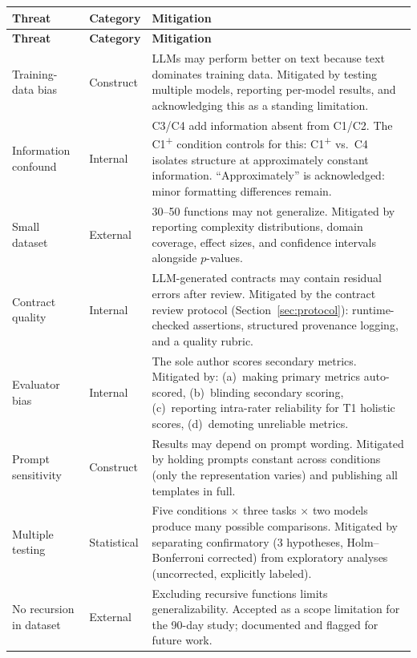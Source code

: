 \documentclass[11pt]{article}
\begin{document}
\begin{longtable}{@{}p{3cm}p{2.5cm}p{7cm}@{}}
  \toprule
  \textbf{Threat} & \textbf{Category} & \textbf{Mitigation} \\
  \midrule
  \endfirsthead
  \toprule
  \textbf{Threat} & \textbf{Category} & \textbf{Mitigation} \\
  \midrule
  \endhead

  Training-data bias &
    Construct &
    LLMs may perform better on text because text dominates training
    data.  Mitigated by testing multiple models, reporting per-model
    results, and acknowledging this as a standing limitation. \\
  \addlinespace

  Information confound &
    Internal &
    C3/C4 add information absent from C1/C2.  The
    C1\textsuperscript{+} condition controls for this:
    C1\textsuperscript{+} vs.\ C4 isolates structure at
    approximately constant information.  ``Approximately'' is
    acknowledged: minor formatting differences remain. \\
  \addlinespace

  Small dataset &
    External &
    30--50 functions may not generalize.  Mitigated by reporting
    complexity distributions, domain coverage, effect sizes, and
    confidence intervals alongside $p$-values. \\
  \addlinespace

  Contract quality &
    Internal &
    LLM-generated contracts may contain residual errors after review.
    Mitigated by the contract review protocol
    (Section~\ref{sec:protocol}): runtime-checked assertions,
    structured provenance logging, and a quality rubric. \\
  \addlinespace

  Evaluator bias &
    Internal &
    The sole author scores secondary metrics.  Mitigated by:
    (a)~making primary metrics auto-scored, (b)~blinding secondary
    scoring, (c)~reporting intra-rater reliability for T1 holistic
    scores, (d)~demoting unreliable metrics. \\
  \addlinespace

  Prompt sensitivity &
    Construct &
    Results may depend on prompt wording.  Mitigated by holding
    prompts constant across conditions (only the representation
    varies) and publishing all templates in full. \\
  \addlinespace

  Multiple testing &
    Statistical &
    Five conditions $\times$ three tasks $\times$ two models produce
    many possible comparisons.  Mitigated by separating confirmatory
    (3 hypotheses, Holm--Bonferroni corrected) from exploratory
    analyses (uncorrected, explicitly labeled). \\
  \addlinespace

  No recursion in dataset &
    External &
    Excluding recursive functions limits generalizability.  Accepted
    as a scope limitation for the 90-day study; documented and
    flagged for future work. \\
  \bottomrule
\end{longtable}
\end{document}
